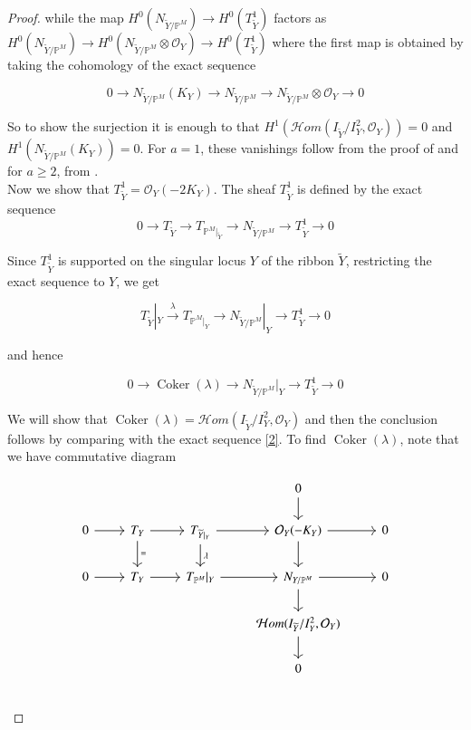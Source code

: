\documentclass[11pt,twoside]{amsart}
\theoremstyle{plain}
\numberwithin{equation}{section}
\theoremstyle{definition}
\begin{document}
\begin{proof}
while the map $H^0(N_{\widetilde{Y}/\mathbb{P}^M}) \to H^0(T_{\widetilde{Y}}^1)$ factors as $H^0(N_{\widetilde{Y}/\mathbb{P}^M}) \to H^0(N_{\widetilde{Y}/\mathbb{P}^M} \otimes \mathcal{O}_Y) \to H^0(T_{\widetilde{Y}}^1)$ where the first map is obtained by taking the cohomology of the exact sequence

\begin{equation*}
 0 \to N_{\widetilde{Y}/\mathbb{P}^M} (K_Y) \to N_{\widetilde{Y}/\mathbb{P}^M} \to N_{\widetilde{Y}/\mathbb{P}^M} \otimes \mathcal{O}_Y \to 0   
\end{equation*}

So to show the surjection it is enough to that $H^1(\mathcal{H}om(I_{\widetilde{Y}}/I_{Y}^2, \mathcal{O}_Y)) = 0$ and $H^1(N_{\widetilde{Y}/\mathbb{P}^M} (K_Y)) = 0$. For $a = 1$, these vanishings follow from the proof of \cite[Theorem $4.1$]{GP97} and for $a \geq 2$, from \cite[Theorem $5.1$]{BMR21}. \\
\color{blue}
Now we show that $T_{\widetilde{Y}}^1 = \mathcal{O}_Y(-2K_Y)$. The sheaf $T_{\widetilde{Y}}^1$ is defined by the exact sequence
$$0 \to T_{\widetilde{Y}} \to T_{\mathbb{P}^M|_{\widetilde{Y}}} \to N_{\widetilde{Y}/\mathbb{P}^M} \to T_{\widetilde{Y}}^1 \to 0$$

Since $T_{\widetilde{Y}}^1$ is supported on the singular locus $Y$ of the ribbon $\widetilde{Y}$, restricting the exact sequence to $Y$, we get 

$$T_{\widetilde{Y}}|_Y \xrightarrow{\lambda} T_{\mathbb{P}^M|_{Y}} \to N_{\widetilde{Y}/\mathbb{P}^M}|_Y \to T_{\widetilde{Y}}^1 \to 0$$

and hence 

$$0 \to \operatorname{Coker}(\lambda) \to N_{\widetilde{Y}/\mathbb{P}^M}|_Y \to T_{\widetilde{Y}}^1 \to 0$$

We will show that $\operatorname{Coker}(\lambda) = \mathcal{H}om(I_{\widetilde{Y}}/I_{Y}^2, \mathcal{O}_Y)$ and then the conclusion follows by comparing with the exact sequence \ref{2}. To find $\operatorname{Coker}(\lambda)$, note that we have commutative diagram 

\[
\begin{tikzcd}
&&& 0 \arrow[d] & \\
0 \arrow[r] & T_Y \arrow[r] \arrow[d, "="] & T_{\widetilde{Y}|_Y} \arrow[d, "\lambda"] \arrow[r] & \mathcal{O}_Y(-K_Y) \arrow[r] \arrow[d] & 0 \\
0 \arrow[r] & T_Y \arrow[r]  & T_{\mathbb{P}^M}|_Y \arrow[r] & N_{Y/\mathbb{P}^M} \arrow[r] \arrow[d] & 0 \\ 
&&& \mathcal{H}om(I_{\widetilde{Y}}/I_{Y}^2, \mathcal{O}_Y) \arrow[d] & \\
&&& 0 & \\
\end{tikzcd}
\]


\end{proof}
\end{document}
